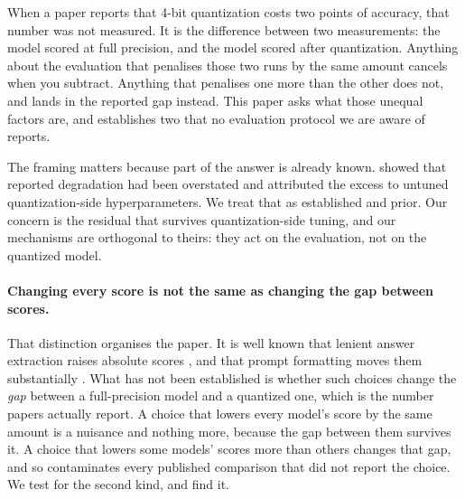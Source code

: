 \documentclass[11pt]{article}
\begin{document}
When a paper reports that 4-bit quantization costs two points of accuracy, that number
was not measured. It is the difference between two measurements: the model scored at
full precision, and the model scored after quantization. Anything about the evaluation
that penalises those two runs by the same amount cancels when you subtract. Anything
that penalises one more than the other does not, and lands in the reported gap instead.
This paper asks what those unequal factors are, and establishes two that no evaluation
protocol we are aware of reports.

The framing matters because part of the answer is already known. \citet{kurtic2025bf16}
showed that reported degradation had been overstated and attributed the excess to
untuned quantization-side hyperparameters. We treat that as established and prior.
Our concern is the residual that survives quantization-side tuning, and our
mechanisms are orthogonal to theirs: they act on the evaluation, not on the
quantized model.

\paragraph{Changing every score is not the same as changing the gap between scores.}
That distinction organises the paper. It is well known that lenient answer
extraction raises absolute scores \citep{jo2025finding,yu2025xfinder}, and that
prompt formatting moves them substantially \citep{sclar2024formatspread}. What has
not been established is whether such choices change the \emph{gap} between a
full-precision model and a quantized one, which is the number papers actually report. A choice that lowers
every model's score by the same amount is a nuisance and nothing more, because the gap
between them survives it. A choice that lowers some models' scores more than others
changes that gap, and so contaminates every published comparison that did not report
the choice. We test for the second kind, and find it.
\end{document}
